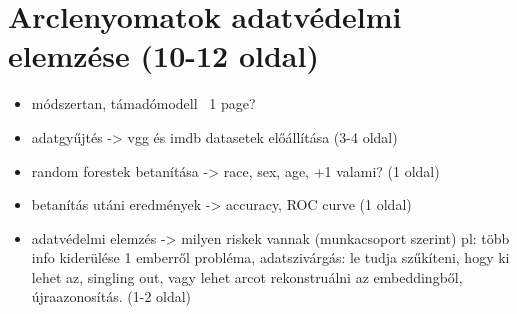 \section{Arclenyomatok adatvédelmi elemzése (10-12 oldal)}
\label{sec:4}

\begin{itemize}
	\item módszertan, támadómodell ~1 page?
	\item adatgyűjtés -> vgg és imdb datasetek előállítása (3-4 oldal)
	\item random forestek betanítása -> race, sex, age, +1 valami? (1 oldal)
	\item betanítás utáni eredmények -> accuracy, ROC curve (1 oldal)
	\item adatvédelmi elemzés -> milyen riskek vannak (munkacsoport szerint) pl: több info kiderülése 1 emberről probléma, adatszivárgás: le tudja szűkíteni, hogy ki lehet az, singling out, vagy lehet arcot rekonstruálni az embeddingből, újraazonosítás. (1-2 oldal)
\end{itemize}



